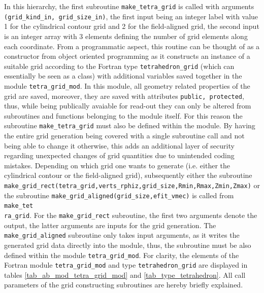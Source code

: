 \documentclass[./main.tex]{subfiles}
\begin{document}
In this hierarchy, the first subroutine \texttt{make\_tetra\_grid} is called with arguments \texttt{(grid\_kind\_in, grid\_size\_in)}, the first input being an integer label with value 1 for the cylindrical contour grid and 2 for the field-aligned grid, the second input is an integer array with 3 elements defining the number of grid elements along each coordinate. From a programmatic aspect, this routine can be thought of as a constructor from object oriented programming as it constructs an instance of a suitable grid according to the Fortran type \texttt{tetrahedron\_grid} (which can essentially be seen as a class) with additional variables saved together in the module \texttt{tetra\_grid\_mod}. In this module, all geometry related properties of the grid are saved, moreover, they are saved with attributes \texttt{public, protected}, thus, while being publically avaiable for read-out they can only be altered from subroutines and functions belonging to the module itself. For this reason the subroutine \texttt{make\_tetra\_grid} must also be defined within the module. By having the entire grid generation being covered with a single subroutine call and not being able to change it otherwise, this adds an additional layer of security regarding unexpected changes of grid quantities due to unintended coding mistakes. 
Depending on which grid one wants to generate (i.e. either the cylindrical contour or the field-aligned grid), subsequently either the subroutine \texttt{make\_grid\_rect(tetra\_grid,verts\_rphiz,grid\_size,Rmin,Rmax,Zmin,Zmax)} or the subroutine \texttt{make\_grid\_aligned(grid\_size,efit\_vmec)} is called from \texttt{make\_tet\\ra\_grid}. For the \texttt{make\_grid\_rect} subroutine, the first two arguments denote the output, the latter arguments are inputs for the grid generation. The \texttt{make\_grid\_aligned} subroutine only takes input arguments, as it writes the generated grid data directly into the module, thus, the subroutine must be also defined within the module \texttt{tetra\_grid\_mod}.
For clarity, the elements of the Fortran module \texttt{tetra\_grid\_mod} and type \texttt{tetrahedron\_grid} are displayed in tables \ref{tab_ab_mod_tetra_grid_mod} and \ref{tab_type_tetrahedron}. All call parameters of the grid constructing subroutines are hereby briefly explained.
\end{document}

